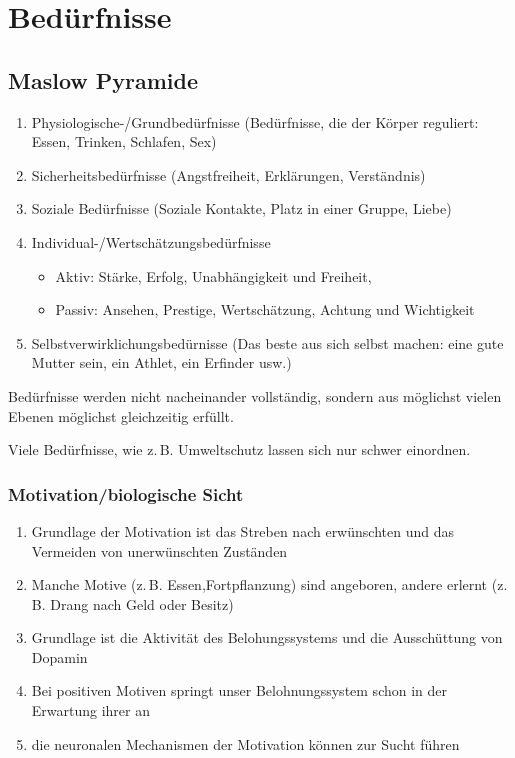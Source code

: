\section{Bedürfnisse}
\subsection{Maslow Pyramide}
\begin{enumerate}\itemsep0em
	\item Physiologische-/Grundbedürfnisse (Bedürfnisse, die der Körper reguliert: Essen, Trinken, Schlafen, Sex)
	\item Sicherheitsbedürfnisse (Angstfreiheit, Erklärungen, Verständnis)
	\item Soziale Bedürfnisse (Soziale Kontakte, Platz in einer Gruppe, Liebe)
	\item Individual-/Wertschätzungsbedürfnisse
	\begin{itemize}\itemsep0em
		\item Aktiv: Stärke, Erfolg, Unabhängigkeit und Freiheit,
		\item Passiv: Ansehen, Prestige, Wertschätzung, Achtung und Wichtigkeit
	\end{itemize}
	\item Selbstverwirklichungsbedürnisse (Das beste aus sich selbst machen: eine gute Mutter sein, ein Athlet, ein Erfinder usw.)
\end{enumerate}
Bedürfnisse werden nicht nacheinander vollständig, sondern aus möglichst vielen Ebenen möglichst gleichzeitig erfüllt.

Viele Bedürfnisse, wie z.\,B. Umweltschutz lassen sich nur schwer einordnen.

\subsubsection{Motivation/biologische Sicht}
\begin{enumerate}
	\item Grundlage der Motivation ist das Streben nach erwünschten und das Vermeiden von unerwünschten Zuständen
	\item Manche Motive (z.\,B. Essen,Fortpflanzung) sind angeboren, andere erlernt (z.\,B. Drang nach Geld oder Besitz)
	\item Grundlage ist die Aktivität des Belohungssystems und die Ausschüttung von Dopamin
	\item Bei positiven Motiven springt unser Belohnungssystem schon in der Erwartung ihrer an
	\item die neuronalen Mechanismen der Motivation können zur Sucht führen
\end{enumerate}

